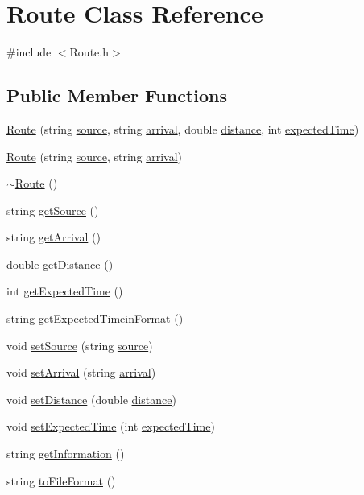 \hypertarget{classRoute}{}\section{Route Class Reference}
\label{classRoute}


{\ttfamily \#include $<$Route.\+h$>$}

\subsection*{Public Member Functions}
\begin{DoxyCompactItemize}
\item 
\hyperlink{classRoute_a4b3c37aa39cb2fb44536b492bcd1f79e}{Route} (string \hyperlink{classRoute_a1534a1a4697d382624b37e9b8e18558c}{source}, string \hyperlink{classRoute_adc36330c18132468643c316cdcde3c86}{arrival}, double \hyperlink{classRoute_a8f6f506a1c61c2e27ba69e5eff5805a1}{distance}, int \hyperlink{classRoute_a1f2959ab7a51bd76846d649a7d93bdbe}{expected\+Time})
\item 
\hyperlink{classRoute_a946619c947f7a1a9d5303860c6a66005}{Route} (string \hyperlink{classRoute_a1534a1a4697d382624b37e9b8e18558c}{source}, string \hyperlink{classRoute_adc36330c18132468643c316cdcde3c86}{arrival})
\item 
\hyperlink{classRoute_a41212532f2bce3298d8f9468f82c62ab}{$\sim$\+Route} ()
\item 
string \hyperlink{classRoute_aded296bd92c4eadb9d2c64d2e5088220}{get\+Source} ()
\item 
string \hyperlink{classRoute_aaa88da20cc0c2f362f332288be26cd2c}{get\+Arrival} ()
\item 
double \hyperlink{classRoute_a4ccb609408c7d1e7020017b2de6e2f31}{get\+Distance} ()
\item 
int \hyperlink{classRoute_a5e9243c4341dee71d9f1c5a310b6538f}{get\+Expected\+Time} ()
\item 
string \hyperlink{classRoute_a7db106e71797ccd6eb91cf36fbe9987d}{get\+Expected\+Timein\+Format} ()
\item 
void \hyperlink{classRoute_ad39247fcbd404ef5755262e0c1cae04d}{set\+Source} (string \hyperlink{classRoute_a1534a1a4697d382624b37e9b8e18558c}{source})
\item 
void \hyperlink{classRoute_ad020607979b427d768f3c0f1f9600fb3}{set\+Arrival} (string \hyperlink{classRoute_adc36330c18132468643c316cdcde3c86}{arrival})
\item 
void \hyperlink{classRoute_a9bd5ad9f9bc229585f183a114c1709e1}{set\+Distance} (double \hyperlink{classRoute_a8f6f506a1c61c2e27ba69e5eff5805a1}{distance})
\item 
void \hyperlink{classRoute_a437920d776b005e425df9c5cfc5de450}{set\+Expected\+Time} (int \hyperlink{classRoute_a1f2959ab7a51bd76846d649a7d93bdbe}{expected\+Time})
\item 
string \hyperlink{classRoute_a3b912b298bc6c3c1656a2d31e6541315}{get\+Information} ()
\item 
string \hyperlink{classRoute_a2e6b5b3d06829495c0db27b63c9cf3a4}{to\+File\+Format} ()
\end{DoxyCompactItemize}

